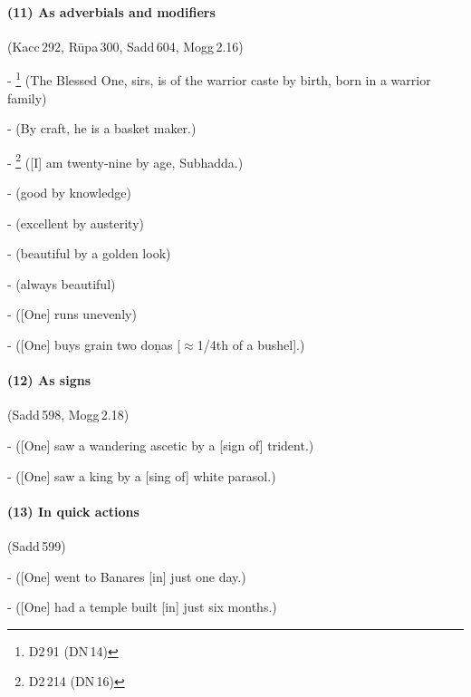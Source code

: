 \paragraph*{(11) As adverbials and modifiers} (Kacc\,292, R\=upa\,300, Sadd\,604, Mogg\,2.16)\par
- \footnote{D2\,91 (DN\,14)} (The Blessed One, sirs, is of the warrior caste by birth, born in a warrior family)\par
-  (By craft, he is a basket maker.)\par
- \footnote{D2\,214 (DN\,16)} ([I] am twenty-nine by age, Subhadda.)\par
-  (good by knowledge)\par
-  (excellent by austerity)\par
-  (beautiful by a golden look)\par
-  (always beautiful)\par
-  ([One] runs unevenly)\par
-  ([One] buys grain two do\d nas [$\approx$1/4th of a bushel].)\par

\paragraph*{(12) As signs} (Sadd\,598, Mogg\,2.18)\par
-  ([One] saw a wandering ascetic by a [sign of] trident.)\par
-  ([One] saw a king by a [sing of] white parasol.)\par

\paragraph*{(13) In quick actions} (Sadd\,599)\par
-  ([One] went to Banares [in] just one day.)\par
-  ([One] had a temple built [in] just six months.)\par

